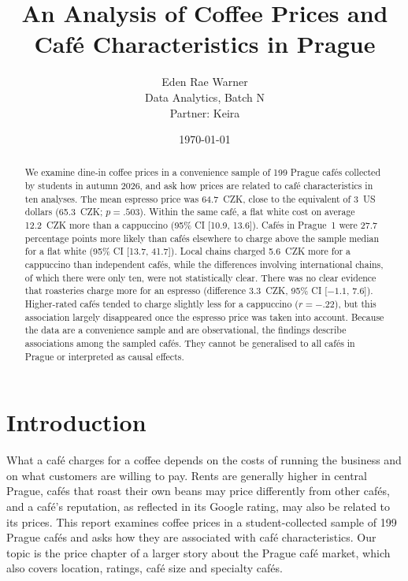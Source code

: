 \documentclass[11pt,a4paper]{article}
\title{
\textbf{An Analysis of Coffee Prices and Café Characteristics in Prague}
}
\author{Eden Rae Warner\\Data Analytics, Batch N\\Partner: Keira}
\date{\today}
\begin{document}
\maketitle

\begin{abstract}
We examine dine-in coffee prices in a convenience sample of 199 Prague caf\'es collected by students in autumn 2026, and ask how prices are related to caf\'e characteristics in ten analyses. The mean espresso price was 64.7~CZK, close to the equivalent of 3~US dollars (65.3~CZK; $p = .503$). Within the same caf\'e, a flat white cost on average 12.2~CZK more than a cappuccino (95\% CI [10.9, 13.6]). Caf\'es in Prague~1 were 27.7 percentage points more likely than caf\'es elsewhere to charge above the sample median for a flat white (95\% CI [13.7, 41.7]). Local chains charged 5.6~CZK more for a cappuccino than independent caf\'es, while the differences involving international chains, of which there were only ten, were not statistically clear. There was no clear evidence that roasteries charge more for an espresso (difference 3.3~CZK, 95\% CI [$-1.1$, 7.6]). Higher-rated caf\'es tended to charge slightly less for a cappuccino ($r = -.22$), but this association largely disappeared once the espresso price was taken into account. Because the data are a convenience sample and are observational, the findings describe associations among the sampled caf\'es. They cannot be generalised to all caf\'es in Prague or interpreted as causal effects.
\end{abstract}

\section{Introduction}

What a caf\'e charges for a coffee depends on the costs of running the business and on what customers are willing to pay. Rents are generally higher in central Prague, caf\'es that roast their own beans may price differently from other caf\'es, and a caf\'e's reputation, as reflected in its Google rating, may also be related to its prices. This report examines coffee prices in a student-collected sample of 199 Prague caf\'es and asks how they are associated with caf\'e characteristics. Our topic is the price chapter of a larger story about the Prague caf\'e market, which also covers location, ratings, caf\'e size and specialty caf\'es.
\end{document}
